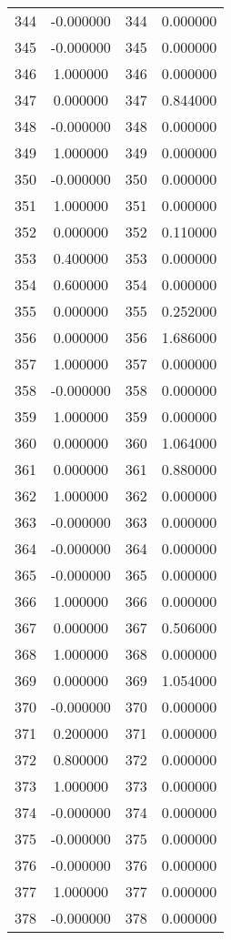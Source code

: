 \documentclass[12pt]{article}
\begin{document}
\begin{longtable}{@{}cccc@{}}
344 & -0.000000 & 344 & 0.000000 \\
345 & -0.000000 & 345 & 0.000000 \\
346 & 1.000000 & 346 & 0.000000 \\
347 & 0.000000 & 347 & 0.844000 \\
348 & -0.000000 & 348 & 0.000000 \\
349 & 1.000000 & 349 & 0.000000 \\
350 & -0.000000 & 350 & 0.000000 \\
351 & 1.000000 & 351 & 0.000000 \\
352 & 0.000000 & 352 & 0.110000 \\
353 & 0.400000 & 353 & 0.000000 \\
354 & 0.600000 & 354 & 0.000000 \\
355 & 0.000000 & 355 & 0.252000 \\
356 & 0.000000 & 356 & 1.686000 \\
357 & 1.000000 & 357 & 0.000000 \\
358 & -0.000000 & 358 & 0.000000 \\
359 & 1.000000 & 359 & 0.000000 \\
360 & 0.000000 & 360 & 1.064000 \\
361 & 0.000000 & 361 & 0.880000 \\
362 & 1.000000 & 362 & 0.000000 \\
363 & -0.000000 & 363 & 0.000000 \\
364 & -0.000000 & 364 & 0.000000 \\
365 & -0.000000 & 365 & 0.000000 \\
366 & 1.000000 & 366 & 0.000000 \\
367 & 0.000000 & 367 & 0.506000 \\
368 & 1.000000 & 368 & 0.000000 \\
369 & 0.000000 & 369 & 1.054000 \\
370 & -0.000000 & 370 & 0.000000 \\
371 & 0.200000 & 371 & 0.000000 \\
372 & 0.800000 & 372 & 0.000000 \\
373 & 1.000000 & 373 & 0.000000 \\
374 & -0.000000 & 374 & 0.000000 \\
375 & -0.000000 & 375 & 0.000000 \\
376 & -0.000000 & 376 & 0.000000 \\
377 & 1.000000 & 377 & 0.000000 \\
378 & -0.000000 & 378 & 0.000000 \\

\end{longtable}
\end{document}
